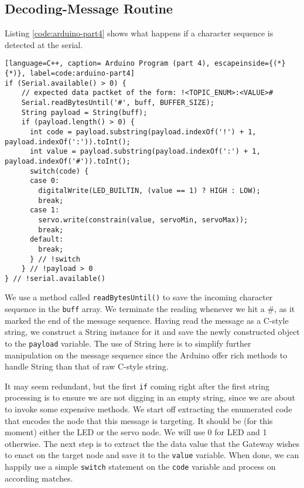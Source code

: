 \subsection{Decoding-Message Routine}
\label{decoding-message}
Listing \ref{code:arduino-part4} shows what happens if a character sequence is detected at the serial.
\begin{lstlisting}[language=C++, caption= Arduino Program (part 4), escapeinside={(*}{*)}, label=code:arduino-part4]
if (Serial.available() > 0) {
    // expected data pactket of the form: !<TOPIC_ENUM>:<VALUE>#
    Serial.readBytesUntil('#', buff, BUFFER_SIZE);
    String payload = String(buff);
    if (payload.length() > 0) {
      int code = payload.substring(payload.indexOf('!') + 1, payload.indexOf(':')).toInt();
      int value = payload.substring(payload.indexOf(':') + 1, payload.indexOf('#')).toInt();
      switch(code) {
      case 0:
        digitalWrite(LED_BUILTIN, (value == 1) ? HIGH : LOW);
        break;
      case 1:
        servo.write(constrain(value, servoMin, servoMax));
        break;
      default:
        break;
      } // !switch
    } // !payload > 0
} // !serial.available()
\end{lstlisting}
We use a method called \texttt{readBytesUntil()} to save the incoming character sequence in the \texttt{buff} array. We terminate the reading whenever we hit a \#, as it marked the end of the message sequence. Having read the message as a C-style string, we construct a String instance for it and save the newly constructed object to the \texttt{payload} variable. The use of String here is to simplify further manipulation on the message sequence since the Arduino offer rich methods to handle String than that of raw C-style string.

It may seem redundant, but the first \texttt{if} coming right after the first string processing is to ensure we are not digging in an empty string, since we are about to invoke some expensive methods. We start off extracting the enumerated code that encodes the node that this message is targeting. It should be (for this moment) either the LED or the servo node. We will use 0 for LED and 1 otherwise. The next step is to extract the the data value that the Gateway wishes to enact on the target node and save it to the \texttt{value} variable. When done, we can happily use a simple \texttt{switch} statement on the \texttt{code} variable and process on according matches.\\ \\
\clearpage

